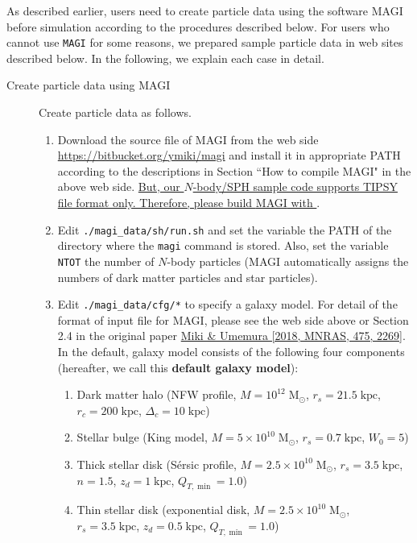 \label{s3sec:NbodySPH_MAGI_usage}
As described earlier, users need to create particle data using the software \textsc{MAGI} before simulation according to the procedures described below. For users who cannot use \texttt{MAGI} for some reasons, we prepared sample particle data in web sites described below. In the following, we explain each case in detail.
\begin{description}
\item[Create particle data using \textsc{MAGI}] Create particle data as follows.
\begin{enumerate}
\item Download the source file of \textsc{MAGI} from the web side \href{https://bitbucket.org/ymiki/magi}{https://bitbucket.org{\slash}ymiki{\slash}magi} and install it in appropriate PATH according to the descriptions in Section ``How to compile MAGI" in the above web side. \ul{But, our {$N$}-body/SPH sample code supports TIPSY file format only. Therefore, please build {\textsc{MAGI}} with {}}.
\item Edit \texttt{./magi\_data/sh/run.sh} and set the variable  the PATH of the directory where the \texttt{magi} command is stored. Also, set the variable \texttt{NTOT} the number of $N$-body particles (\textsc{MAGI} automatically assigns the numbers of dark matter particles and star particles).
\item Edit \texttt{./magi\_data/cfg/*} to specify a galaxy model. For detail of the format of input file for \textsc{MAGI}, please see the web side above or Section 2.4 in the original paper \href{https://doi.org/10.1093/mnras/stx3327}{Miki \& Umemura [2018, MNRAS, 475, 2269]}. In the default, galaxy model consists of the following four components (hereafter, we call this \textbf{default galaxy model}):
\begin{enumerate}[label=(\roman*)]
\item Dark matter halo (NFW profile, $M=10^{12}\;\mathrm{M_{\odot}}$, $r_{s}=21.5\;\mathrm{kpc}$, $r_{c}=200\;\mathrm{kpc}$, $\Delta_{c}=10\;\mathrm{kpc}$)
\item Stellar bulge (King model, $M=5\times 10^{10}\;\mathrm{M_{\odot}}$, $r_{s}=0.7\;\mathrm{kpc}$, $W_{0}=5$)
\item Thick stellar disk  (S{\'e}rsic profile, $M=2.5\times 10^{10}\;\mathrm{M_{\odot}}$, $r_{s}=3.5\;\mathrm{kpc}$, $n=1.5$, $z_{d}=1\;\mathrm{kpc}$, $Q_{T,\min}=1.0$)
\item Thin stellar disk (exponential disk, $M=2.5\times 10^{10}\;\mathrm{M_{\odot}}$, $r_{s}=3.5\;\mathrm{kpc}$, $z_{d}=0.5\;\mathrm{kpc}$, $Q_{T,\min}=1.0$)

\end{enumerate}
\end{enumerate}
\end{description}
